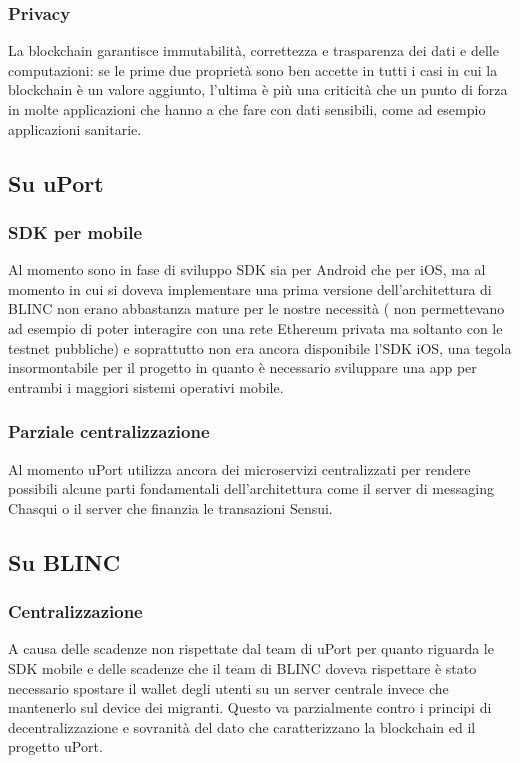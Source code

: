 \subsubsection{Privacy}

La blockchain garantisce immutabilità, correttezza e trasparenza dei dati e delle computazioni:
se le prime due proprietà sono ben accette in tutti i casi in cui la blockchain è un valore aggiunto,
l'ultima è più una criticità che un punto di forza in molte applicazioni
che hanno a che fare con dati sensibili, come ad esempio applicazioni sanitarie.

\subsection{Su uPort}

\subsubsection{SDK per mobile}

Al momento sono in fase di sviluppo SDK sia per Android che per iOS, ma al momento in cui si doveva 
implementare una prima versione dell'architettura di BLINC non erano abbastanza mature per le nostre necessità (
non permettevano ad esempio di poter interagire con una rete Ethereum privata ma soltanto con le testnet pubbliche)
e soprattutto non era ancora disponibile l'SDK iOS, una tegola insormontabile per il progetto in quanto è necessario
sviluppare una app per entrambi i maggiori sistemi operativi mobile.

\subsubsection{Parziale centralizzazione}

Al momento uPort utilizza ancora dei microservizi centralizzati per rendere possibili alcune parti fondamentali
dell’architettura come il server di messaging Chasqui o il server che finanzia le transazioni Sensui.

\subsection{Su BLINC}

\subsubsection{Centralizzazione}

A causa delle scadenze non rispettate dal team di uPort per quanto riguarda le SDK mobile e delle scadenze
che il team di BLINC doveva rispettare è stato necessario spostare il wallet degli utenti su un server centrale
invece che mantenerlo sul device dei migranti. Questo va parzialmente contro i principi di decentralizzazione
e sovranità del dato che caratterizzano la blockchain ed il progetto uPort.

